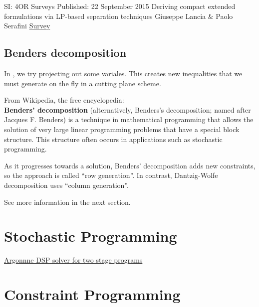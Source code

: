 \begin{resource}
SI: 4OR Surveys
Published: 22 September 2015
Deriving compact extended formulations via LP-based separation techniques
Giuseppe Lancia \& Paolo Serafini 
\href{https://doi-org.ezproxy.lib.vt.edu/10.1007/s10479-015-2012-4}{Survey}
\end{resource}

\section{Benders decomposition} 

In , we try projecting out some variales.  This creates new inequalities that we must generate on the fly in a cutting plane scheme.








From Wikipedia, the free encyclopedia:\\

{\bf Benders' decomposition} (alternatively, Benders's decomposition; named after Jacques F. Benders) is a technique in mathematical programming that allows the solution of very large linear programming problems that have a special block structure. This structure often occurs in applications such as stochastic programming.

As it progresses towards a solution, Benders' decomposition adds new constraints, so the approach is called ``row generation''. In contrast, Dantzig-Wolfe decomposition uses ``column generation''.

See more information in the next section.

\chapter{Stochastic Programming}

\begin{resource}
\href{https://github.com/Argonne-National-Laboratory/DSP}{Argonnne DSP solver for two stage programs}
\end{resource}


\chapter{Constraint Programming}


%
%
%
